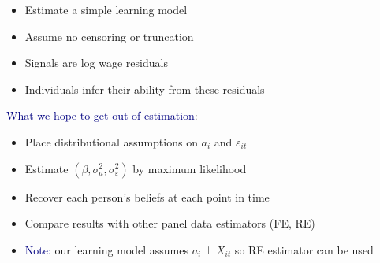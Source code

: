 \documentclass[aspectratio=169]{beamer}
\begin{document}
\begin{frame}

\begin{itemize}
\itemsep1.5em
\item<1-> Estimate a simple learning model
\item<2-> Assume no censoring or truncation
\item<3-> Signals are log wage residuals
\item<4-> Individuals infer their ability from these residuals
\end{itemize}

\end{frame}

\begin{frame}

\textcolor{navy}{What we hope to get out of estimation}:
\bigskip

\begin{itemize}
\itemsep1.5em
\item<2-> Place distributional assumptions on $a_i$ and $\varepsilon_{it}$
\item<3-> Estimate $(\beta,\sigma^2_a,\sigma^2_\varepsilon)$ by maximum likelihood
\item<4-> Recover each person's beliefs at each point in time
\item<5-> Compare results with other panel data estimators (FE, RE)
\item<6-> \textcolor{navy}{Note:} our learning model assumes $a_i \perp X_{it}$ so RE estimator can be used
\end{itemize}

\end{frame}
\end{document}

